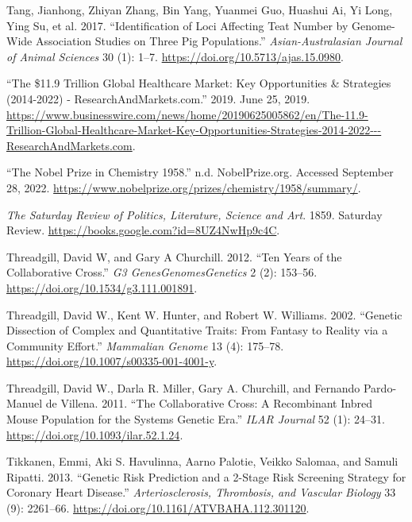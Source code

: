 \documentclass[
]{book}
\newlength{\cslhangindent}
\newlength{\cslentryspacingunit} %
\newenvironment{CSLReferences}[2] %
 {%
  \setlength{\parindent}{0pt}
  \ifodd #1
  \let\oldpar\par
  \def\par{\hangindent=\cslhangindent\oldpar}
  \fi
  \setlength{\parskip}{#2\cslentryspacingunit}
 }%
 {}
\begin{document}
\begin{CSLReferences}{1}{0}
\leavevmode{}%
Tang, Jianhong, Zhiyan Zhang, Bin Yang, Yuanmei Guo, Huashui Ai, Yi Long, Ying Su, et al. 2017. {``Identification of Loci Affecting Teat Number by Genome-Wide Association Studies on Three Pig Populations.''} \emph{Asian-Australasian Journal of Animal Sciences} 30 (1): 1--7. \url{https://doi.org/10.5713/ajas.15.0980}.

\leavevmode{}%
{``The \$11.9 {Trillion Global Healthcare Market}: {Key Opportunities} \& {Strategies} (2014-2022) - {ResearchAndMarkets}.com.''} 2019. June 25, 2019. \url{https://www.businesswire.com/news/home/20190625005862/en/The-11.9-Trillion-Global-Healthcare-Market-Key-Opportunities-Strategies-2014-2022---ResearchAndMarkets.com}.

\leavevmode{}%
{``The {Nobel Prize} in {Chemistry} 1958.''} n.d. {NobelPrize.org}. Accessed September 28, 2022. \url{https://www.nobelprize.org/prizes/chemistry/1958/summary/}.

\leavevmode{}%
\emph{The {Saturday Review} of {Politics}, {Literature}, {Science} and {Art}}. 1859. {Saturday Review}. \url{https://books.google.com?id=8UZ4NwHp9c4C}.

\leavevmode{}%
Threadgill, David W, and Gary A Churchill. 2012. {``Ten {Years} of the {Collaborative Cross}.''} \emph{G3 Genes\textbar Genomes\textbar Genetics} 2 (2): 153--56. \url{https://doi.org/10.1534/g3.111.001891}.

\leavevmode{}%
Threadgill, David W., Kent W. Hunter, and Robert W. Williams. 2002. {``Genetic Dissection of Complex and Quantitative Traits: From Fantasy to Reality via a Community Effort.''} \emph{Mammalian Genome} 13 (4): 175--78. \url{https://doi.org/10.1007/s00335-001-4001-y}.

\leavevmode{}%
Threadgill, David W., Darla R. Miller, Gary A. Churchill, and Fernando Pardo-Manuel de Villena. 2011. {``The {Collaborative Cross}: {A Recombinant Inbred Mouse Population} for the {Systems Genetic Era}.''} \emph{ILAR Journal} 52 (1): 24--31. \url{https://doi.org/10.1093/ilar.52.1.24}.

\leavevmode{}%
Tikkanen, Emmi, Aki S. Havulinna, Aarno Palotie, Veikko Salomaa, and Samuli Ripatti. 2013. {``Genetic {Risk Prediction} and a 2-{Stage Risk Screening Strategy} for {Coronary Heart Disease}.''} \emph{Arteriosclerosis, Thrombosis, and Vascular Biology} 33 (9): 2261--66. \url{https://doi.org/10.1161/ATVBAHA.112.301120}.


\end{CSLReferences}
\end{document}

